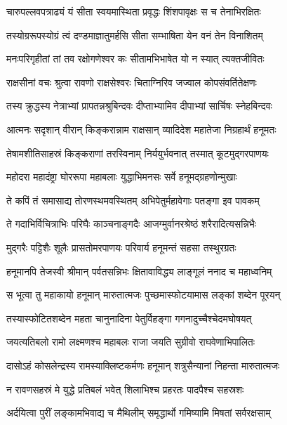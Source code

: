 \twolineshloka
{चारुपल्लवपत्राढ्यं यं सीता स्वयमास्थिता}
{प्रवृद्धः शिंशपावृक्षः स च तेनाभिरक्षितः} %

\twolineshloka
{तस्योग्ररूपस्योग्रं त्वं दण्डमाज्ञातुमर्हसि}
{सीता सम्भाषिता येन वनं तेन विनाशितम्} %

\twolineshloka
{मनःपरिगृहीतां तां तव रक्षोगणेश्वर}
{कः सीतामभिभाषेत यो न स्यात् त्यक्तजीवितः} %

\twolineshloka
{राक्षसीनां वचः श्रुत्वा रावणो राक्षसेश्वरः}
{चिताग्निरिव जज्वाल कोपसंवर्तितेक्षणः} %

\twolineshloka
{तस्य क्रुद्धस्य नेत्राभ्यां प्रापतन्नश्रुबिन्दवः}
{दीप्ताभ्यामिव दीपाभ्यां सार्चिषः स्नेहबिन्दवः} %

\twolineshloka
{आत्मनः सदृशान् वीरान् किङ्करान्नाम राक्षसान्}
{व्यादिदेश महातेजा निग्रहार्थं हनूमतः} %

\twolineshloka
{तेषामशीतिसाहस्रं किङ्कराणां तरस्विनाम्}
{निर्ययुर्भवनात् तस्मात् कूटमुद्गरपाणयः} %

\twolineshloka
{महोदरा महादंष्ट्रा घोररूपा महाबलाः}
{युद्धाभिमनसः सर्वे हनूमद्ग्रहणोन्मुखाः} %

\twolineshloka
{ते कपिं तं समासाद्य तोरणस्थमवस्थितम्}
{अभिपेतुर्महावेगाः पतङ्गा इव पावकम्} %

\twolineshloka
{ते गदाभिर्विचित्राभिः परिघैः काञ्चनाङ्गदैः}
{आजग्मुर्वानरश्रेष्ठं शरैरादित्यसन्निभैः} %

\twolineshloka
{मुद्गरैः पट्टिशैः शूलैः प्रासतोमरपाणयः}
{परिवार्य हनूमन्तं सहसा तस्थुरग्रतः} %

\twolineshloka
{हनूमानपि तेजस्वी श्रीमान् पर्वतसन्निभः}
{क्षितावाविद्ध्य लाङ्गूलं ननाद च महाध्वनिम्} %

\twolineshloka
{स भूत्वा तु महाकायो हनूमान् मारुतात्मजः}
{पुच्छमास्फोटयामास लङ्कां शब्देन पूरयन्} %

\twolineshloka
{तस्यास्फोटितशब्देन महता चानुनादिना}
{पेतुर्विहङ्गा गगनादुच्चैश्चेदमघोषयत्} %

\twolineshloka
{जयत्यतिबलो रामो लक्ष्मणश्च महाबलः}
{राजा जयति सुग्रीवो राघवेणाभिपालितः} %

\twolineshloka
{दासोऽहं कोसलेन्द्रस्य रामस्याक्लिष्टकर्मणः}
{हनूमान् शत्रुसैन्यानां निहन्ता मारुतात्मजः} %

\twolineshloka
{न रावणसहस्रं मे युद्धे प्रतिबलं भवेत्}
{शिलाभिश्च प्रहरतः पादपैश्च सहस्रशः} %

\twolineshloka
{अर्दयित्वा पुरीं लङ्कामभिवाद्य च मैथिलीम्}
{समृद्धार्थो गमिष्यामि मिषतां सर्वरक्षसाम्} %

